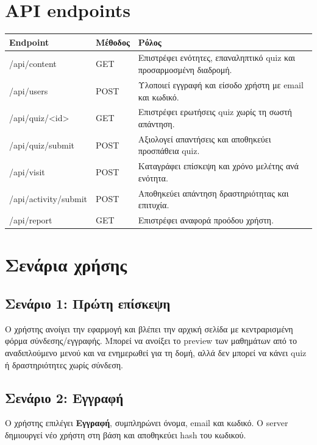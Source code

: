 \documentclass[12pt,a4paper]{article}
\newcommand{\textlatin}[1]{\textenglish{#1}}
\begin{document}
\section{API endpoints}

\begin{longtable}{|p{4cm}|p{3cm}|p{7cm}|}
\hline
\textbf{Endpoint} & \textbf{Μέθοδος} & \textbf{Ρόλος} \\
\hline
\textlatin{/api/content} & \textlatin{GET} & Επιστρέφει ενότητες, επαναληπτικό quiz και προσαρμοσμένη διαδρομή. \\
\hline
\textlatin{/api/users} & \textlatin{POST} & Υλοποιεί εγγραφή και είσοδο χρήστη με email και κωδικό. \\
\hline
\textlatin{/api/quiz/<id>} & \textlatin{GET} & Επιστρέφει ερωτήσεις quiz χωρίς τη σωστή απάντηση. \\
\hline
\textlatin{/api/quiz/submit} & \textlatin{POST} & Αξιολογεί απαντήσεις και αποθηκεύει προσπάθεια quiz. \\
\hline
\textlatin{/api/visit} & \textlatin{POST} & Καταγράφει επίσκεψη και χρόνο μελέτης ανά ενότητα. \\
\hline
\textlatin{/api/activity/submit} & \textlatin{POST} & Αποθηκεύει απάντηση δραστηριότητας και επιτυχία. \\
\hline
\textlatin{/api/report} & \textlatin{GET} & Επιστρέφει αναφορά προόδου χρήστη. \\
\hline
\end{longtable}

\section{Σενάρια χρήσης}

\subsection{Σενάριο 1: Πρώτη επίσκεψη}

Ο χρήστης ανοίγει την εφαρμογή και βλέπει την αρχική σελίδα με κεντραρισμένη φόρμα σύνδεσης/εγγραφής. Μπορεί να ανοίξει το preview των μαθημάτων από το αναδιπλούμενο μενού και να ενημερωθεί για τη δομή, αλλά δεν μπορεί να κάνει quiz ή δραστηριότητες χωρίς σύνδεση.

\subsection{Σενάριο 2: Εγγραφή}

Ο χρήστης επιλέγει \textbf{Εγγραφή}, συμπληρώνει όνομα, email και κωδικό. Ο server δημιουργεί νέο χρήστη στη βάση και αποθηκεύει hash του κωδικού.
\end{document}
